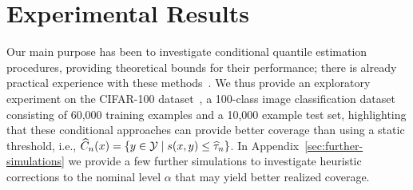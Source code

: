 \documentclass{article}
\newcommand{\radphi}{b_{\phi}}
\newcommand{\scorefunc}{s}
\newcommand{\scoreval}{\scorefunc}
\newcommand{\scorerv}{S}
\begin{document}


\section{Experimental Results}

Our main purpose has been to investigate conditional quantile estimation
procedures, providing theoretical bounds for their performance; there is
already practical experience with these methods~\cite{GibbsChCa25}.
%
We thus provide an
exploratory experiment on the CIFAR-100
dataset~\cite{KrizhevskyHi09}, a 100-class image classification dataset
consisting of 60,000 training examples and a 10,000 example test set,
highlighting that these conditional approaches can provide better
coverage than using a static threshold, i.e.,
$\what{C}_n(x) = \{y \in \mc{Y} \mid \scoreval(x, y) \le \what{\tau}_n\}$.
%
In Appendix~\ref{sec:further-simulations} we provide a few further
simulations to investigate heuristic corrections to the nominal level
$\alpha$ that may yield better realized coverage.
\end{document}
